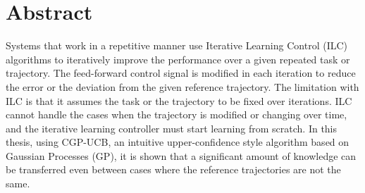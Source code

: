 \chapter*{Abstract}

Systems that work in a repetitive manner use Iterative Learning Control (ILC) algorithms to iteratively improve the performance over a given repeated task or trajectory. The feed-forward control signal is modified in each iteration to reduce the error or the deviation from the given reference trajectory. The limitation with ILC is that it assumes the task or the trajectory to be fixed over iterations. ILC cannot handle the cases when the trajectory is modified or changing over time, and the iterative learning controller must start learning from scratch. In this thesis, using CGP-UCB, an intuitive upper-confidence style algorithm based on Gaussian Processes (GP), it is shown that a significant amount of knowledge can be transferred even between cases where the reference trajectories are not the same. 
